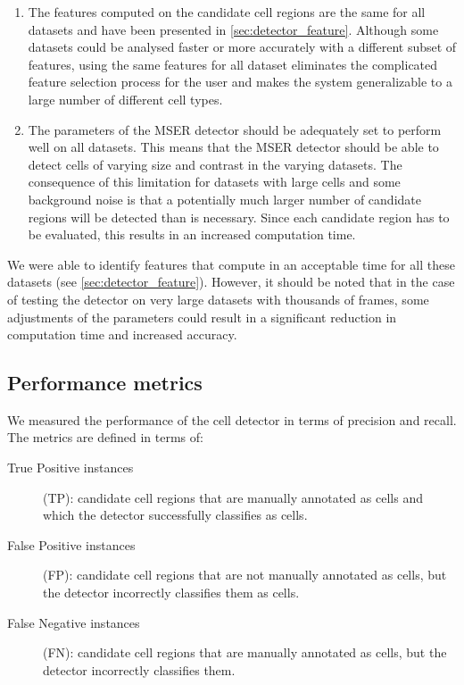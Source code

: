 	\begin{enumerate}
		\item The features computed on the candidate cell regions are the same for all datasets and have been presented in \cref{sec:detector_feature}. Although some datasets could be analysed faster or more accurately with a different subset of features, using the same features for all dataset eliminates the complicated feature selection process for the user and makes the system generalizable to a large number of different cell types.
		
		\item The parameters of the MSER detector should be adequately set to perform well on all datasets. This means that the MSER detector should be able to detect cells of varying size and contrast in the varying datasets. The consequence of this limitation for datasets with large cells and some background noise is that a potentially much larger number of candidate regions will be detected than is necessary. Since each candidate region has to be evaluated, this results in an increased computation time.
	\end{enumerate}
	
	We were able to identify features that compute in an acceptable time for all these datasets (see \cref{sec:detector_feature}). However, it should be noted that in the case of testing the detector on very large datasets with thousands of frames, some adjustments of the parameters could result in a significant reduction in computation time and increased accuracy.
	
	\subsection{Performance metrics}
	
	We measured the performance of the cell detector in terms of precision and recall. The metrics are defined in terms of:
	
	\begin{description}
		\item[True Positive instances] (TP): candidate cell regions that are manually annotated as cells and which the detector successfully classifies as cells.
		\item[False Positive instances] (FP): candidate cell regions that are not manually annotated as cells, but the detector incorrectly classifies them as cells.
		\item[False Negative instances] (FN): candidate cell regions that are manually annotated as cells, but the detector incorrectly classifies them.
	\end{description}
	
